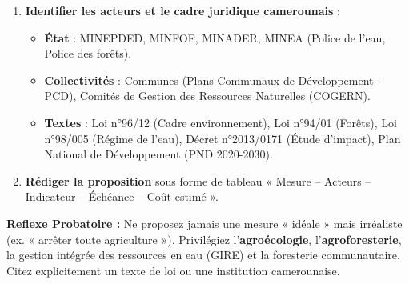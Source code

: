 \documentclass[11pt]{article}
\newcommand{\cle}[1]{{\popxbold\color{popdark}#1}}
\begin{document}
\begin{methode}
\begin{enumerate}
\begin{itemize}
        \end{itemize}
        \item \textbf{Identifier les acteurs et le cadre juridique camerounais} :
        \begin{itemize}
            \item \textbf{État} : MINEPDED, MINFOF, MINADER, MINEA (Police de l'eau, Police des forêts).
            \item \textbf{Collectivités} : Communes (Plans Communaux de Développement - PCD), Comités de Gestion des Ressources Naturelles (COGERN).
            \item \textbf{Textes} : Loi n°96/12 (Cadre environnement), Loi n°94/01 (Forêts), Loi n°98/005 (Régime de l'eau), Décret n°2013/0171 (Étude d'impact), Plan National de Développement (PND 2020-2030).
        \end{itemize}
        \item \textbf{Rédiger la proposition} sous forme de tableau « Mesure – Acteurs – Indicateur – Échéance – Coût estimé ».
    \end{enumerate}
    \textbf{Reflexe Probatoire :} Ne proposez jamais une mesure « idéale » mais irréaliste (ex. « arrêter toute agriculture »). Privilégiez l'\textbf{agroécologie}, l'\textbf{agroforesterie}, la \cle{gestion intégrée des ressources en eau (GIRE)} et la \cle{foresterie communautaire}. Citez explicitement un texte de loi ou une institution camerounaise.
\end{methode}
\end{document}
